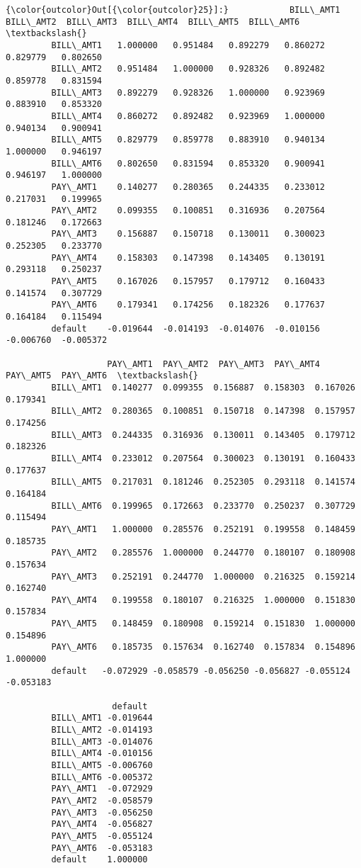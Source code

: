 \documentclass[11pt]{article}
\begin{document}
\begin{Verbatim}[commandchars=\\\{\}]
{\color{outcolor}Out[{\color{outcolor}25}]:}            BILL\_AMT1  BILL\_AMT2  BILL\_AMT3  BILL\_AMT4  BILL\_AMT5  BILL\_AMT6  \textbackslash{}
         BILL\_AMT1   1.000000   0.951484   0.892279   0.860272   0.829779   0.802650   
         BILL\_AMT2   0.951484   1.000000   0.928326   0.892482   0.859778   0.831594   
         BILL\_AMT3   0.892279   0.928326   1.000000   0.923969   0.883910   0.853320   
         BILL\_AMT4   0.860272   0.892482   0.923969   1.000000   0.940134   0.900941   
         BILL\_AMT5   0.829779   0.859778   0.883910   0.940134   1.000000   0.946197   
         BILL\_AMT6   0.802650   0.831594   0.853320   0.900941   0.946197   1.000000   
         PAY\_AMT1    0.140277   0.280365   0.244335   0.233012   0.217031   0.199965   
         PAY\_AMT2    0.099355   0.100851   0.316936   0.207564   0.181246   0.172663   
         PAY\_AMT3    0.156887   0.150718   0.130011   0.300023   0.252305   0.233770   
         PAY\_AMT4    0.158303   0.147398   0.143405   0.130191   0.293118   0.250237   
         PAY\_AMT5    0.167026   0.157957   0.179712   0.160433   0.141574   0.307729   
         PAY\_AMT6    0.179341   0.174256   0.182326   0.177637   0.164184   0.115494   
         default    -0.019644  -0.014193  -0.014076  -0.010156  -0.006760  -0.005372   
         
                    PAY\_AMT1  PAY\_AMT2  PAY\_AMT3  PAY\_AMT4  PAY\_AMT5  PAY\_AMT6  \textbackslash{}
         BILL\_AMT1  0.140277  0.099355  0.156887  0.158303  0.167026  0.179341   
         BILL\_AMT2  0.280365  0.100851  0.150718  0.147398  0.157957  0.174256   
         BILL\_AMT3  0.244335  0.316936  0.130011  0.143405  0.179712  0.182326   
         BILL\_AMT4  0.233012  0.207564  0.300023  0.130191  0.160433  0.177637   
         BILL\_AMT5  0.217031  0.181246  0.252305  0.293118  0.141574  0.164184   
         BILL\_AMT6  0.199965  0.172663  0.233770  0.250237  0.307729  0.115494   
         PAY\_AMT1   1.000000  0.285576  0.252191  0.199558  0.148459  0.185735   
         PAY\_AMT2   0.285576  1.000000  0.244770  0.180107  0.180908  0.157634   
         PAY\_AMT3   0.252191  0.244770  1.000000  0.216325  0.159214  0.162740   
         PAY\_AMT4   0.199558  0.180107  0.216325  1.000000  0.151830  0.157834   
         PAY\_AMT5   0.148459  0.180908  0.159214  0.151830  1.000000  0.154896   
         PAY\_AMT6   0.185735  0.157634  0.162740  0.157834  0.154896  1.000000   
         default   -0.072929 -0.058579 -0.056250 -0.056827 -0.055124 -0.053183   
         
                     default  
         BILL\_AMT1 -0.019644  
         BILL\_AMT2 -0.014193  
         BILL\_AMT3 -0.014076  
         BILL\_AMT4 -0.010156  
         BILL\_AMT5 -0.006760  
         BILL\_AMT6 -0.005372  
         PAY\_AMT1  -0.072929  
         PAY\_AMT2  -0.058579  
         PAY\_AMT3  -0.056250  
         PAY\_AMT4  -0.056827  
         PAY\_AMT5  -0.055124  
         PAY\_AMT6  -0.053183  
         default    1.000000  
\end{Verbatim}
            
\end{document}
